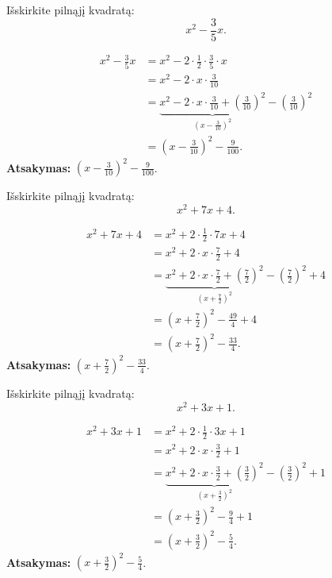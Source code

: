 \documentclass[11pt,a4paper]{scrartcl}
\begin{document}
\begin{example}
Išskirkite pilnąjį kvadratą:
\[
x^2-\frac{3}{5}x.
\]
\end{example}
\begin{solution}
\[
\begin{aligned}
x^2-\frac{3}{5}x
&=x^2-2\cdot\frac{1}{2}\cdot\frac{3}{5}\cdot x \\
&=x^2-2\cdot x\cdot\frac{3}{10} \\
& =\underbrace{x^2-2\cdot x\cdot\frac{3}{10}+\left(\frac{3}{10}\right)^2}_{\left(x-\frac{3}{10}\right)^2}-\left(\frac{3}{10}\right)^2 \\
& =\left(x-\frac{3}{10}\right)^2-\frac{9}{100}.
\end{aligned}
\]
\textbf{Atsakymas:} $\left(x-\frac{3}{10}\right)^2-\frac{9}{100}$.
\end{solution}

\begin{example}
Išskirkite pilnąjį kvadratą:
\[
x^2+7x+4.
\]
\end{example}
\begin{solution}
\[
\begin{aligned}
x^2+7x+4
&=x^2+2\cdot\frac{1}{2}\cdot7x+4 \\
&=x^2+2\cdot x\cdot\frac{7}{2}+4 \\
&=\underbrace{x^2+2\cdot x\cdot\frac{7}{2}+\left(\frac{7}{2}\right)^2}_{\left(x+\frac{7}{2}\right)^2}-\left(\frac{7}{2}\right)^2+4 \\
&=\left(x+\frac{7}{2}\right)^2-\frac{49}{4}+4 \\
&=\left(x+\frac{7}{2}\right)^2-\frac{33}{4}.
\end{aligned}
\]
\textbf{Atsakymas:} $\left(x+\frac{7}{2}\right)^2-\frac{33}{4}$.
\end{solution}

\begin{example}
Išskirkite pilnąjį kvadratą:
\[
x^2+3x+1.
\]
\end{example}
\begin{solution}
\[
\begin{aligned}
x^2+3x+1
&=x^2+2\cdot\frac{1}{2}\cdot3x+1\\
&=x^2+2\cdot x\cdot\frac{3}{2}+1\\
&=\underbrace{x^2+2\cdot x\cdot\frac{3}{2}+\left(\frac{3}{2}\right)^2}_{\left(x+\frac{3}{2}\right)^2}-\left(\frac{3}{2}\right)^2+1\\
&=\left(x+\frac{3}{2}\right)^2-\frac{9}{4}+1\\
&=\left(x+\frac{3}{2}\right)^2-\frac{5}{4}.
\end{aligned}
\]
\textbf{Atsakymas:} $\left(x+\frac{3}{2}\right)^2-\frac{5}{4}$.
\end{solution}
\end{document}
